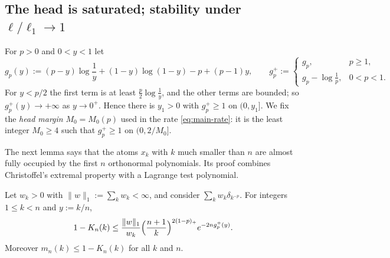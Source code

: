 \subsection{\texorpdfstring{The head is saturated; stability under $\ell/\ell_1\to1$}{The head is saturated; stability}}\label{sec:smoothing-stab}

For $p>0$ and $0<y<1$ let
\begin{equation}\label{eq:gp}
  g_p(y):=(p-y)\log\frac1y+(1-y)\log(1-y)-p+(p-1)y,\qquad
  g_p^+:=\begin{cases}g_p,&p\ge1,\\ g_p-\log\frac1p,&0<p<1.\end{cases}
\end{equation}
For $y<p/2$ the first term is at least $\frac p2\log\frac1y$, and the other terms are bounded; so
$g_p^+(y)\to+\infty$ as $y\to0^+$. Hence there is $y_1>0$ with $g_p^+\ge1$ on $(0,y_1]$. We fix the \emph{head margin} $M_0=M_0(p)$ used in
the rate \eqref{eq:main-rate}: it is the least integer $M_0\ge4$ such that $g_p^+\ge1$ on $(0,2/M_0]$.

The next lemma says that the atoms $x_k$ with $k$ much smaller than $n$ are almost fully occupied by the first $n$
orthonormal polynomials. Its proof combines Christoffel's extremal property with a Lagrange test polynomial.

\begin{lemma}\label{lem:saturation}
Let $w_k>0$ with $\|w\|_1:=\sum_kw_k<\infty$, and consider $\sum_kw_k\delta_{k^{-p}}$. For integers $1\le k<n$ and $y:=k/n$,
\[
  1-K_n(k)\le\frac{\|w\|_1}{w_k}\Bigl(\frac{n+1}k\Bigr)^{2(1-p)_+}e^{-2ng_p^+(y)} .
\]
Moreover $m_n(k)\le1-K_n(k)$ for all $k$ and $n$.
\end{lemma}

